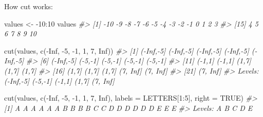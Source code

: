 \documentclass[
]{book}
\newenvironment{Shaded}{\begin{snugshade}}{\end{snugshade}}
\newcommand{\AttributeTok}[1]{\textcolor[rgb]{0.77,0.63,0.00}{#1}}
\newcommand{\CommentTok}[1]{\textcolor[rgb]{0.56,0.35,0.01}{\textit{#1}}}
\newcommand{\ConstantTok}[1]{\textcolor[rgb]{0.00,0.00,0.00}{#1}}
\newcommand{\DecValTok}[1]{\textcolor[rgb]{0.00,0.00,0.81}{#1}}
\newcommand{\FunctionTok}[1]{\textcolor[rgb]{0.00,0.00,0.00}{#1}}
\newcommand{\NormalTok}[1]{#1}
\newcommand{\OtherTok}[1]{\textcolor[rgb]{0.56,0.35,0.01}{#1}}
\newcommand{\SpecialCharTok}[1]{\textcolor[rgb]{0.00,0.00,0.00}{#1}}
\begin{document}
How cut works:

\begin{Shaded}
\begin{Highlighting}[]
\NormalTok{values }\OtherTok{\textless{}{-}} \SpecialCharTok{{-}}\DecValTok{10}\SpecialCharTok{:}\DecValTok{10}
\NormalTok{values}
\CommentTok{\#\textgreater{}  [1] {-}10  {-}9  {-}8  {-}7  {-}6  {-}5  {-}4  {-}3  {-}2  {-}1   0   1   2   3}
\CommentTok{\#\textgreater{} [15]   4   5   6   7   8   9  10}
\end{Highlighting}
\end{Shaded}

\begin{Shaded}
\begin{Highlighting}[]
\FunctionTok{cut}\NormalTok{(values, }\FunctionTok{c}\NormalTok{(}\SpecialCharTok{{-}}\ConstantTok{Inf}\NormalTok{, }\SpecialCharTok{{-}}\DecValTok{5}\NormalTok{, }\SpecialCharTok{{-}}\DecValTok{1}\NormalTok{, }\DecValTok{1}\NormalTok{, }\DecValTok{7}\NormalTok{, }\ConstantTok{Inf}\NormalTok{))}
\CommentTok{\#\textgreater{}  [1] ({-}Inf,{-}5] ({-}Inf,{-}5] ({-}Inf,{-}5] ({-}Inf,{-}5] ({-}Inf,{-}5]}
\CommentTok{\#\textgreater{}  [6] ({-}Inf,{-}5] ({-}5,{-}1]   ({-}5,{-}1]   ({-}5,{-}1]   ({-}5,{-}1]  }
\CommentTok{\#\textgreater{} [11] ({-}1,1]    ({-}1,1]    (1,7]     (1,7]     (1,7]    }
\CommentTok{\#\textgreater{} [16] (1,7]     (1,7]     (1,7]     (7, Inf]  (7, Inf] }
\CommentTok{\#\textgreater{} [21] (7, Inf] }
\CommentTok{\#\textgreater{} Levels: ({-}Inf,{-}5] ({-}5,{-}1] ({-}1,1] (1,7] (7, Inf]}
\end{Highlighting}
\end{Shaded}

\begin{Shaded}
\begin{Highlighting}[]
\FunctionTok{cut}\NormalTok{(values, }\FunctionTok{c}\NormalTok{(}\SpecialCharTok{{-}}\ConstantTok{Inf}\NormalTok{, }\SpecialCharTok{{-}}\DecValTok{5}\NormalTok{, }\SpecialCharTok{{-}}\DecValTok{1}\NormalTok{, }\DecValTok{1}\NormalTok{, }\DecValTok{7}\NormalTok{, }\ConstantTok{Inf}\NormalTok{), }\AttributeTok{labels =}\NormalTok{ LETTERS[}\DecValTok{1}\SpecialCharTok{:}\DecValTok{5}\NormalTok{], }\AttributeTok{right =} \ConstantTok{TRUE}\NormalTok{)}
\CommentTok{\#\textgreater{}  [1] A A A A A A B B B B C C D D D D D D E E E}
\CommentTok{\#\textgreater{} Levels: A B C D E}
\end{Highlighting}
\end{Shaded}
\end{document}
